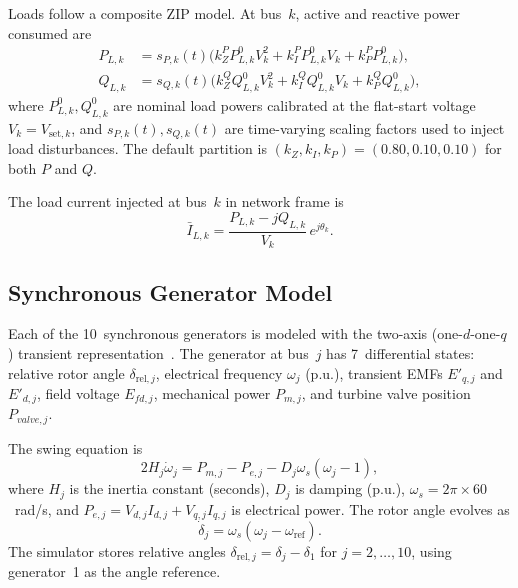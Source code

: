 \documentclass[11pt]{article}
\begin{document}
Loads follow a composite ZIP model.  At bus~$k$, active and reactive
power consumed are
\begin{align}
  P_{L,k} &= s_{P,k}(t) \bigl(k_Z^P P_{L,k}^0 V_k^2
    + k_I^P P_{L,k}^0 V_k + k_P^P P_{L,k}^0\bigr), \label{eq:zip_p}\\
  Q_{L,k} &= s_{Q,k}(t) \bigl(k_Z^Q Q_{L,k}^0 V_k^2
    + k_I^Q Q_{L,k}^0 V_k + k_P^Q Q_{L,k}^0\bigr), \label{eq:zip_q}
\end{align}
where $P_{L,k}^0, Q_{L,k}^0$ are nominal load powers calibrated at
the flat-start voltage $V_k = V_{\mathrm{set},k}$, and
$s_{P,k}(t), s_{Q,k}(t)$ are time-varying scaling factors used to
inject load disturbances.  The default partition is
$(k_Z, k_I, k_P) = (0.80, 0.10, 0.10)$ for both $P$ and $Q$.

The load current injected at bus~$k$ in network frame is
\begin{equation}
  \bar{I}_{L,k} = \frac{P_{L,k} - jQ_{L,k}}{V_k} \, e^{j\theta_k}.
  \label{eq:load_current}
\end{equation}

\subsection{Synchronous Generator Model}
\label{sec:sg_model}

Each of the 10~synchronous generators is modeled with the two-axis
(one-$d$-one-$q$) transient
representation~\cite{SauerPai98, Kundur94PowerSystems}.  The generator
at bus~$j$ has 7~differential states: relative rotor angle
$\delta_{\mathrm{rel},j}$, electrical frequency $\omega_j$ (p.u.),
transient EMFs $E'_{q,j}$ and $E'_{d,j}$, field voltage $E_{fd,j}$,
mechanical power $P_{m,j}$, and turbine valve position $P_{valve,j}$.

The swing equation is
\begin{equation}
  2H_j \dot{\omega}_j = P_{m,j} - P_{e,j}
    - D_j \omega_s (\omega_j - 1),
  \label{eq:swing}
\end{equation}
where $H_j$ is the inertia constant (seconds), $D_j$ is damping
(p.u.), $\omega_s = 2\pi \times 60$~rad/s, and
$P_{e,j} = V_{d,j}I_{d,j} + V_{q,j}I_{q,j}$ is electrical power.
The rotor angle evolves as
\begin{equation}
  \dot{\delta}_j = \omega_s(\omega_j - \omega_{\mathrm{ref}}).
  \label{eq:delta}
\end{equation}
The simulator stores relative angles
$\delta_{\mathrm{rel},j} = \delta_j - \delta_1$ for $j = 2, \ldots, 10$,
using generator~1 as the angle reference.
\end{document}
